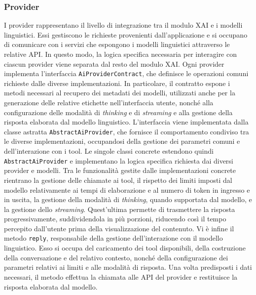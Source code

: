 \subsubsection{Provider}
I provider rappresentano il livello di integrazione tra il modulo XAI e i modelli linguistici. Essi gestiscono le richieste provenienti dall'applicazione e si occupano di 
comunicare con i servizi che espongono i modelli linguistici attraverso le relative API. In questo modo, la logica specifica necessaria per interagire con ciascun provider 
viene separata dal resto del modulo XAI.
\newline
Ogni provider implementa l'interfaccia \texttt{AiProviderContract}, che definisce le operazioni comuni richieste dalle diverse implementazioni. In particolare, il contratto 
espone i metodi necessari al recupero dei metadati dei modelli, utilizzati anche per la generazione delle relative etichette nell'interfaccia utente, nonché alla configurazione 
delle modalità di \textit{thinking} e di \textit{streaming} e alla gestione della risposta elaborata dal modello linguistico.
\newline
L'interfaccia viene implementata dalla classe astratta \texttt{AbstractAiProvider}, che fornisce il comportamento condiviso tra le diverse implementazioni, occupandosi della 
gestione dei parametri comuni e dell'interazione con i tool. Le singole classi concrete estendono quindi \texttt{AbstractAiProvider} e implementano la logica specifica richiesta 
dai diversi provider e modelli.
\newline
Tra le funzionalità gestite dalle implementazioni concrete rientrano la gestione delle chiamate ai tool, il rispetto dei limiti imposti dal modello relativamente ai tempi di 
elaborazione e al numero di token in ingresso e in uscita, la gestione della modalità di \textit{thinking}, quando supportata dal modello, e la gestione dello \textit{streaming}. 
Quest'ultima permette di trasmettere la risposta progressivamente, suddividendola in più porzioni, riducendo così il tempo percepito dall'utente prima della visualizzazione del 
contenuto.
\newline
Vi è infine il metodo \texttt{reply}, responsabile della gestione dell'interazione con il modello linguistico. Esso si occupa del caricamento dei tool disponibili, della 
costruzione della conversazione e del relativo contesto, nonché della configurazione dei parametri relativi ai limiti e alle modalità di risposta. Una volta predisposti i 
dati necessari, il metodo effettua la chiamata alle API del provider e restituisce la risposta elaborata dal modello.

